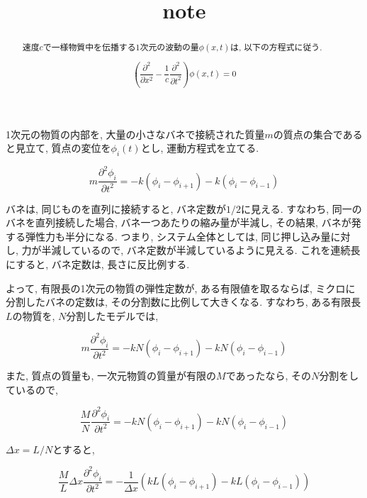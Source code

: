 \documentclass{jsarticle} \usepackage[dvipdfmx]{graphicx} \usepackage[dvipdfmx]{hyperref}
\title{note}
\begin{document}
\maketitle

\begin{abstract}
  速度$c$で一様物質中を伝播する1次元の波動の量$\phi(x, t)$は, 以下の方程式に従う. 

  \begin{equation}
    \left( \frac{\partial^2}{\partial x^2} - \frac{1}{c}\frac{\partial^2}{\partial t^2} \right) \phi(x, t) = 0
  \end{equation}

\end{abstract}

1次元の物質の内部を, 大量の小さなバネで接続された質量$m$の質点の集合であると見立て, 
質点の変位を$\phi_i(t)$とし, 運動方程式を立てる. 

\begin{equation}
  m \frac{\partial^2 \phi_i}{\partial t^2} = -k(\phi_i - \phi_{i + 1}) - k(\phi_i - \phi_{i - 1})
\end{equation}

バネは, 同じものを直列に接続すると, バネ定数が$1/2$に見える. すなわち, 
同一のバネを直列接続した場合, バネ一つあたりの縮み量が半減し, その結果, バネが発する弾性力も半分になる. 
つまり, システム全体としては, 同じ押し込み量に対し, 力が半減しているので, バネ定数が半減しているように見える. 
これを連続長にすると, バネ定数は, 長さに反比例する. 

よって, 有限長の1次元の物質の弾性定数が, ある有限値を取るならば, ミクロに分割したバネの定数は, その分割数に比例して大きくなる. 
すなわち, ある有限長$L$の物質を, $N$分割したモデルでは, 

\begin{equation}
  m \frac{\partial^2 \phi_i}{\partial t^2} = -kN(\phi_i - \phi_{i + 1}) - kN(\phi_i - \phi_{i - 1})
\end{equation}

また, 質点の質量も, 一次元物質の質量が有限の$M$であったなら, その$N$分割をしているので, 

\begin{equation}
  \frac{M}{N} \frac{\partial^2 \phi_i}{\partial t^2} = -kN(\phi_i - \phi_{i + 1}) - kN(\phi_i - \phi_{i - 1})
\end{equation}

$\Delta x = L/N$とすると, 

\begin{equation}
  \frac{M}{L} \Delta x \frac{\partial^2 \phi_i}{\partial t^2} = -\frac{1}{\Delta x} \left( kL(\phi_i - \phi_{i + 1}) - kL(\phi_i - \phi_{i - 1}) \right)
\end{equation}
\end{document}
